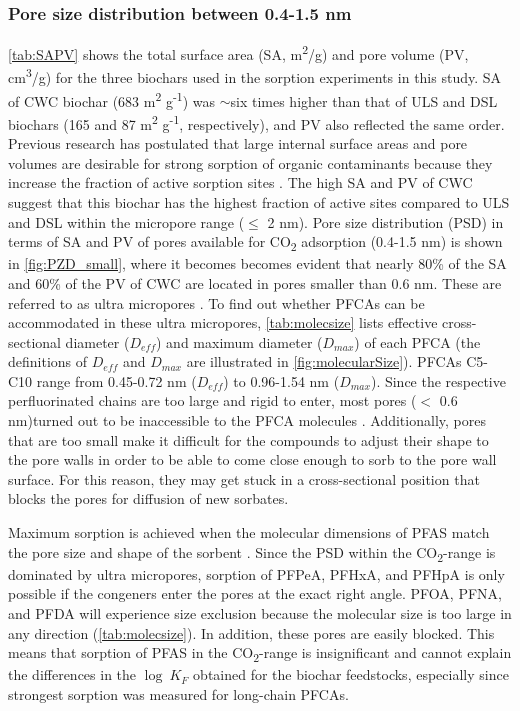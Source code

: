 \subsubsection{Pore size distribution between 0.4-1.5 nm}
\cref{tab:SAPV} shows the total surface area (SA, m\textsuperscript{2}/g) and pore volume (PV, cm\textsuperscript{3}/g) for the three biochars used in the sorption experiments in this study. SA of CWC biochar (683 m\textsuperscript{2} g\textsuperscript{-1}) was $\sim$six times higher than that of ULS and DSL biochars (165 and 87  m\textsuperscript{2} g\textsuperscript{-1}, respectively), and PV also reflected the same order. Previous research has postulated that large internal surface areas and pore volumes are desirable for strong sorption of organic contaminants because they increase the fraction of active sorption sites \citep{ahmed2020per,Hale2016}. The high SA and PV of CWC suggest that this biochar has the highest fraction of active sites compared to ULS and DSL within the micropore range ($\le$ 2 nm). Pore size distribution (PSD) in terms of SA and PV of pores available for CO\textsubscript{2} adsorption (0.4-1.5 nm) is shown in \cref{fig:PZD_small}, where it becomes becomes evident that nearly 80\% of the SA and 60\% of the PV of CWC are located in pores smaller than 0.6 nm. These are referred to as ultra micropores \citep{bardestani2019experimental}. To find out whether PFCAs can be accommodated in these ultra micropores, \cref{tab:molecsize} lists effective cross-sectional diameter ($D_{eff}$) and maximum diameter ($D_{max}$) of each PFCA (the definitions of $D_{eff}$ and $D_{max}$ are illustrated in \cref{fig:molecularSize}). PFCAs C5-C10 range from 0.45-0.72 nm ($D_{eff}$) to 0.96-1.54 nm ($D_{max}$). Since the respective perfluorinated chains are too large and rigid to enter, most pores ($<$ 0.6 nm)turned out to be inaccessible to the PFCA molecules \citep{yu2009sorption}. Additionally, pores that are too small make it difficult for the compounds to adjust their shape to the pore walls in order to be able to come close enough to sorb to the pore wall surface. For this reason, they may get stuck in a cross-sectional position that blocks the pores for diffusion of new sorbates. 

Maximum sorption is achieved when the molecular dimensions of PFAS match the pore size and shape of the sorbent \citep{Hale2016}. Since the PSD within the CO\textsubscript{2}-range is dominated by ultra micropores, sorption of PFPeA, PFHxA, and PFHpA is only possible if the congeners enter the pores at the exact right angle. PFOA, PFNA, and PFDA will experience size exclusion because the molecular size is too large in any direction (\cref{tab:molecsize}). In addition, these pores are easily blocked. This means that sorption of PFAS in the CO\textsubscript{2}-range is insignificant and cannot explain the differences in the $\log~K_F$ obtained for the biochar feedstocks, especially since strongest sorption was measured for long-chain PFCAs.

